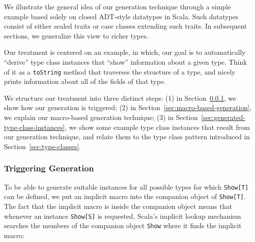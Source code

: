 \documentclass[preprint,nocopyrightspace]{sigplanconf}
\begin{document}
We illustrate the general idea of our generation technique through
a simple example based solely on closed ADT-style datatypes in
Scala. Such datatypes consist of either sealed traits or
case classes extending such traits. In subsequent sections, we
generalize this view to richer types.

Our treatment is centered on an example, in which, our goal is to
automatically ``derive'' type class instances that ``show'' information about
a given type. Think of it as a \verb|toString| method that traverses the
structure of a type, and nicely prints information about all of the fields of
that type.

We structure our treatment into three distinct steps:
(1) in Section~\ref{sec:triggering-generation}, we show how our generation is triggered;
(2) in Section~\ref{sec:macro-based-generation}, we explain our macro-based generation technique;
(3) in Section~\ref{sec:generated-type-class-instances}, we show some example type class instances that result from our generation technique, and relate them to the type class pattern introduced in Section~\ref{sec:type-classes}.




\subsubsection{Triggering Generation}
\label{sec:triggering-generation}

To be able to generate suitable instances for all possible types for which
\verb|Show[T]| can be defined, we put an implicit macro into the companion
object of \verb|Show[T]|. The fact that the implicit macro is inside the
companion object means that whenever an instance \verb|Show[S]| is requested,
Scala's implicit lookup mechanism searches the members of the companion object
\verb|Show| where it finds the implicit macro:
\end{document}
